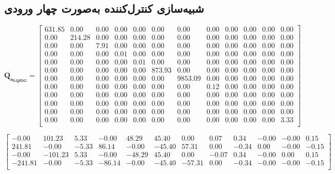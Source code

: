 \subsection{شبیه‌سازی کنترل‌کننده به‌صورت چهار ورودی}
\setcounter{MaxMatrixCols}{20}


\begin{equation*}
	\boldsymbol{Q_{a_{LQIDG}}} = 
	\begin{bmatrix}
		631.85 & 0.00 & 0.00 & 0.00 & 0.00 & 0.00 & 0.00 & 0.00 & 0.00 & 0.00 & 0.00 & 0.00\\ 
		0.00 & 214.28 & 0.00 & 0.00 & 0.00 & 0.00 & 0.00 & 0.00 & 0.00 & 0.00 & 0.00 & 0.00\\ 
		0.00 & 0.00 & 7.91 & 0.00 & 0.00 & 0.00 & 0.00 & 0.00 & 0.00 & 0.00 & 0.00 & 0.00\\ 
		0.00 & 0.00 & 0.00 & 0.01 & 0.00 & 0.00 & 0.00 & 0.00 & 0.00 & 0.00 & 0.00 & 0.00\\ 
		0.00 & 0.00 & 0.00 & 0.00 & 0.01 & 0.00 & 0.00 & 0.00 & 0.00 & 0.00 & 0.00 & 0.00\\ 
		0.00 & 0.00 & 0.00 & 0.00 & 0.00 & 873.93 & 0.00 & 0.00 & 0.00 & 0.00 & 0.00 & 0.00\\ 
		0.00 & 0.00 & 0.00 & 0.00 & 0.00 & 0.00 & 9853.09 & 0.00 & 0.00 & 0.00 & 0.00 & 0.00\\ 
		0.00 & 0.00 & 0.00 & 0.00 & 0.00 & 0.00 & 0.00 & 0.12 & 0.00 & 0.00 & 0.00 & 0.00\\ 
		0.00 & 0.00 & 0.00 & 0.00 & 0.00 & 0.00 & 0.00 & 0.00 & 0.00 & 0.00 & 0.00 & 0.00\\ 
		0.00 & 0.00 & 0.00 & 0.00 & 0.00 & 0.00 & 0.00 & 0.00 & 0.00 & 0.00 & 0.00 & 0.00\\ 
		0.00 & 0.00 & 0.00 & 0.00 & 0.00 & 0.00 & 0.00 & 0.00 & 0.00 & 0.00 & 0.00 & 0.00\\ 
		0.00 & 0.00 & 0.00 & 0.00 & 0.00 & 0.00 & 0.00 & 0.00 & 0.00 & 0.00 & 0.00 & 3.33\\ 
		
	\end{bmatrix}
\end{equation*}

\begin{equation*}
	\begin{bmatrix}
		-0.00 & 101.23 & 5.33 & -0.00 & 48.29 & 45.40 & 0.00 & 0.07 & 0.34 & -0.00 & -0.00 & 0.15\\ 
		241.81 & -0.00 & -5.33 & 86.14 & -0.00 & -45.40 & 57.31 & 0.00 & -0.34 & 0.00 & -0.00 & -0.15\\ 
		-0.00 & -101.23 & 5.33 & -0.00 & -48.29 & 45.40 & 0.00 & -0.07 & 0.34 & -0.00 & 0.00 & 0.15\\ 
		-241.81 & -0.00 & -5.33 & -86.14 & -0.00 & -45.40 & -57.31 & 0.00 & -0.34 & -0.00 & -0.00 & -0.15\\ 
	\end{bmatrix}
\end{equation*}


